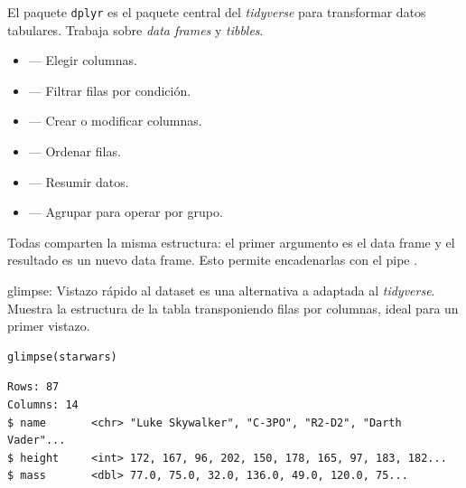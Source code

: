 \documentclass[8pt]{beamer}
\begin{document}
	\subtitle{Cheatsheet de \texttt{dplyr}}

	\begin{frame}[plain]
		\maketitle
	\end{frame}




\begin{frame}[fragile]{El paquete \texttt{dplyr}}
	 es el paquete central del \emph{tidyverse} para transformar datos tabulares. Trabaja sobre \emph{data frames} y \emph{tibbles}.

	\begin{itemize}
		\item {} --- Elegir columnas.
		\item {} --- Filtrar filas por condición.
		\item {} --- Crear o modificar columnas.
		\item {} --- Ordenar filas.
		\item {} --- Resumir datos.
		\item {} --- Agrupar para operar por grupo.
	\end{itemize}

	Todas comparten la misma estructura: el primer argumento es el data frame y el resultado es un nuevo data frame. Esto permite encadenarlas con el pipe \rscript{|>}.
\end{frame}





\begin{frame}[fragile]{glimpse: Vistazo rápido al dataset}
	 es una alternativa a  adaptada al \emph{tidyverse}. Muestra la estructura de la tabla transponiendo filas por columnas, ideal para un primer vistazo.
\begin{lstlisting}[style=RScript]
glimpse(starwars)
\end{lstlisting}
\begin{lstlisting}[style=RConsole]
Rows: 87
Columns: 14
$ name       <chr> "Luke Skywalker", "C-3PO", "R2-D2", "Darth Vader"...
$ height     <int> 172, 167, 96, 202, 150, 178, 165, 97, 183, 182...
$ mass       <dbl> 77.0, 75.0, 32.0, 136.0, 49.0, 120.0, 75...
\end{lstlisting}
\end{frame}
\end{document}
